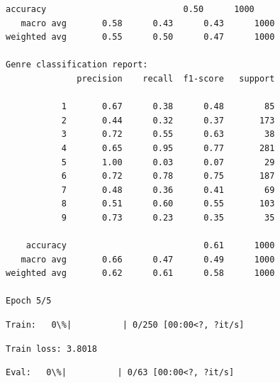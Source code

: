 \documentclass[11pt]{article}
\begin{document}
\begin{Verbatim}[commandchars=\\\{\}]
    accuracy                           0.50      1000
   macro avg       0.58      0.43      0.43      1000
weighted avg       0.55      0.50      0.47      1000

Genre classification report:
              precision    recall  f1-score   support

           1       0.67      0.38      0.48        85
           2       0.44      0.32      0.37       173
           3       0.72      0.55      0.63        38
           4       0.65      0.95      0.77       281
           5       1.00      0.03      0.07        29
           6       0.72      0.78      0.75       187
           7       0.48      0.36      0.41        69
           8       0.51      0.60      0.55       103
           9       0.73      0.23      0.35        35

    accuracy                           0.61      1000
   macro avg       0.66      0.47      0.49      1000
weighted avg       0.62      0.61      0.58      1000

Epoch 5/5
    \end{Verbatim}

    
    \begin{Verbatim}[commandchars=\\\{\}]
Train:   0\%|          | 0/250 [00:00<?, ?it/s]
    \end{Verbatim}

    
    \begin{Verbatim}[commandchars=\\\{\}]
Train loss: 3.8018
    \end{Verbatim}

    
    \begin{Verbatim}[commandchars=\\\{\}]
Eval:   0\%|          | 0/63 [00:00<?, ?it/s]
    \end{Verbatim}
\end{document}

